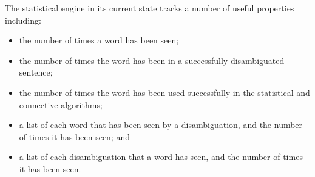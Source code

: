 The statistical engine in its current state tracks a number of useful properties
including: 

\begin{itemize}
	\item the number of times a word has been seen;
	\item the number of times the word has been in a successfully disambiguated
	sentence;
	\item the number of times the word has been used successfully in the 
	statistical and connective algorithms;
	\item a list of each word that has been seen by a disambiguation, and the 
	number of times it has been seen; and 
	\item a list of each disambiguation that a word has seen, and the number of 
	times it has been seen. 
\end{itemize}
